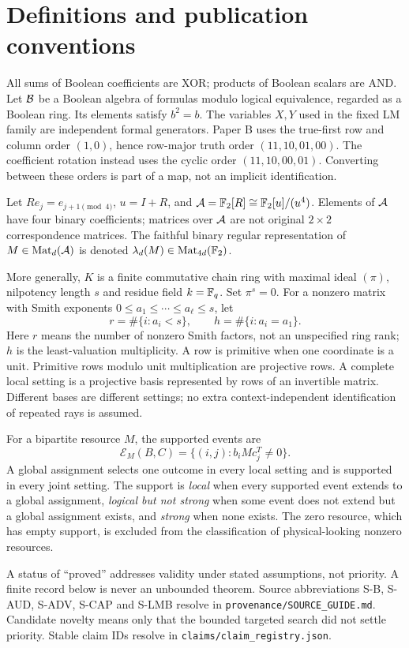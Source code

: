 \section{Definitions and publication conventions}
\label{sec:defs}
All sums of Boolean coefficients are XOR; products of Boolean scalars are AND.
Let $\mathcal B$ be a Boolean algebra of formulas modulo logical equivalence, regarded
as a Boolean ring. Its elements satisfy $b^2=b$. The variables $X,Y$ used in the
fixed LM family are independent formal generators. Paper B uses the true-first
row and column order $(1,0)$, hence row-major truth order $(11,10,01,00)$.
The coefficient rotation instead uses the cyclic order $(11,10,00,01)$.
Converting between these orders is part of a map, not an implicit identification.

Let $R e_j=e_{j+1\pmod 4}$, $u=I+R$, and
$\mathcal A=\mathbb F_2[R]\cong\mathbb F_2[u]/(u^4)$. Elements of $\mathcal A$ have four binary coefficients;
matrices over $\mathcal A$ are not original $2\times2$ correspondence matrices.
The faithful binary regular representation of $M\in\operatorname{Mat}_d(\mathcal A)$ is denoted
$\lambda_d(M)\in\operatorname{Mat}_{4d}(\mathbb F_2)$.

More generally, $K$ is a finite commutative chain ring with maximal ideal
$(\pi)$, nilpotency length $s$ and residue field $k=\mathbb F_q$. Set $\pi^s=0$.
For a nonzero matrix with Smith exponents
$0\leq a_1\leq\cdots\leq a_\ell\leq s$, let
\[
 r=\#\{i:a_i<s\},\qquad h=\#\{i:a_i=a_1\}.
\]
Here $r$ means the number of nonzero Smith factors, not an unspecified ring
rank; $h$ is the least-valuation multiplicity. A row is primitive when one
coordinate is a unit. Primitive rows modulo unit multiplication are projective
rows. A complete local setting is a projective basis represented by rows of an
invertible matrix. Different bases are different settings; no extra
context-independent identification of repeated rays is assumed.

For a bipartite resource $M$, the supported events are
\[
 \mathcal E_M(B,C)=\{(i,j):b_i M c_j^T\ne0\}.
\]
A global assignment selects one outcome in every local setting and is supported
in every joint setting. The support is \emph{local} when every supported event
extends to a global assignment, \emph{logical but not strong} when some event
does not extend but a global assignment exists, and \emph{strong} when none
exists. The zero resource, which has empty support, is excluded from the
classification of physical-looking nonzero resources.

A status of ``proved'' addresses validity under stated assumptions, not priority.
A finite record below is never an unbounded theorem. Source abbreviations
S-B, S-AUD, S-ADV, S-CAP and S-LMB resolve in
\texttt{provenance/SOURCE\_GUIDE.md}. Candidate novelty means only that the
bounded targeted search did not settle priority. Stable claim IDs resolve in
\texttt{claims/claim\_registry.json}.
